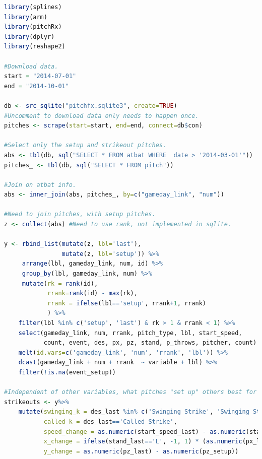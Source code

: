 \documentclass[12pt]{article}
\numberwithin{equation}{subsection}
\begin{document}
\begin{lstlisting}[language=R, caption=Rstudio R snippets]
library(splines)
library(arm)
library(pitchRx)
library(dplyr)
library(reshape2)

#Download data.
start = "2014-07-01"
end = "2014-10-01"

db <- src_sqlite("pitchfx.sqlite3", create=TRUE)
#Uncomment to download data only needs to happen once.
pitches <- scrape(start=start, end=end, connect=db$con)

#Select only the setup and strikeout pitches.
abs <- tbl(db, sql("SELECT * FROM atbat WHERE  date > '2014-03-01'"))
pitches_ <- tbl(db, sql("SELECT * FROM pitch"))

#Join on atbat info.
abs <- inner_join(abs, pitches_, by=c("gameday_link", "num"))

#Need to join pitches, with setup pitches.
z <- collect(abs) #Need to use rank, not implemented in sqlite.

y <- rbind_list(mutate(z, lbl='last'),
                mutate(z, lbl='setup')) %>%
     arrange(lbl, gameday_link, num, id) %>%
     group_by(lbl, gameday_link, num) %>%
     mutate(rk = rank(id),
            rrank=rank(id) - max(rk),
            rrank = ifelse(lbl=='setup', rrank+1, rrank)
            ) %>%
    filter(lbl %in% c('setup', 'last') & rk > 1 & rrank < 1) %>%
    select(gameday_link, num, rrank, pitch_type, lbl, start_speed,
           count, event, des, px, pz, stand, p_throws, pitcher, count) %>%
    melt(id.vars=c('gameday_link', 'num', 'rrank', 'lbl')) %>%
    dcast(gameday_link + num + rrank  ~ variable + lbl) %>%
    filter(!is.na(event_setup))

#Independent of other variables, what pitches "set up" others best for swings and misses?
strikeouts <- y%>%
    mutate(swinging_k = des_last %in% c('Swinging Strike', 'Swinging Strike (Blocked)'),
           called_k = des_last=='Called Strike',
           speed_change = as.numeric(start_speed_last) - as.numeric(start_speed_setup),
           x_change = ifelse(stand_last=='L', -1, 1) * (as.numeric(px_last) - as.numeric(px_setup)),
           y_change = as.numeric(pz_last) - as.numeric(pz_setup))
\end{lstlisting}
\end{document}
